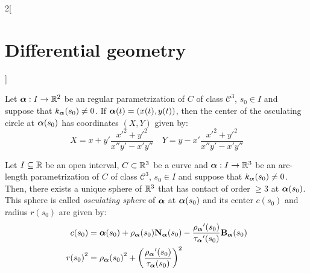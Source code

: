 \documentclass[../../../main.tex]{subfiles}
\begin{document}
\begin{multicols}{2}[\section{Differential geometry}]
\begin{proposition}
  \end{proposition}
  \begin{proposition}
    Let $\boldsymbol{\mathrm{\alpha}}:I\rightarrow\mathbb{R}^2$ be an regular parametrization of $C$ of class $\mathcal{C}^3$, $s_0\in I$ and suppose that $k_{\boldsymbol{\mathrm{\alpha}}}(s_0)\ne 0$. If $\boldsymbol{\mathrm{\alpha}}(t)=(x(t),y(t))$, then the center of the osculating circle at $\boldsymbol{\mathrm{\alpha}}(s_0)$ has coordinates $(X,Y)$ given by:
    $$X=x+y'\frac{{x'}^2+{y'}^2}{x''y'-x'y''}\quad Y=y-x'\frac{{x'}^2+{y'}^2}{x''y'-x'y''}$$
  \end{proposition}
  \begin{center}
    \begin{minipage}{\linewidth}
      \centering
      
    \end{minipage}
  \end{center}
  \begin{definition}
    Let $I\subseteq\mathbb{R}$ be an open interval, $C\subset\mathbb{R}^3$ be a curve and $\boldsymbol{\mathrm{\alpha}}:I\rightarrow\mathbb{R}^3$ be an arc-length parametrization of $C$ of class $\mathcal{C}^3$, $s_0\in I$ and suppose that $k_{\boldsymbol{\mathrm{\alpha}}}(s_0)\ne 0$. Then, there exists a unique sphere of $\mathbb{R}^3$ that has contact of order $\geq 3$ at $\boldsymbol{\mathrm{\alpha}}(s_0)$. This sphere is called \emph{osculating sphere} of $\boldsymbol{\mathrm{\alpha}}$ at $\boldsymbol{\mathrm{\alpha}}(s_0)$ and its center $c(s_0)$ and radius $r(s_0)$ are given by:
    \begin{align*}
      c(s_0)     & =\boldsymbol{\mathrm{\alpha}}(s_0)+{\rho_{\boldsymbol{\mathrm{\alpha}}}}(s_0){\boldsymbol{\mathrm{N}}_{\boldsymbol{\mathrm{\alpha}}}}(s_0)-\frac{{\rho_{\boldsymbol{\mathrm{\alpha}}}}'(s_0)}{{\tau_{\boldsymbol{\mathrm{\alpha}}}}'(s_0)}{\boldsymbol{\mathrm{B}}_{\boldsymbol{\mathrm{\alpha}}}}(s_0) \\
      {r(s_0)}^2 & ={{\rho_{\boldsymbol{\mathrm{\alpha}}}}(s_0)}^2+{\left(\frac{{\rho_{\boldsymbol{\mathrm{\alpha}}}}'(s_0)}{{\tau_{\boldsymbol{\mathrm{\alpha}}}}(s_0)}\right)}^2
    \end{align*}
  \end{definition}

\end{multicols}
\end{document}
